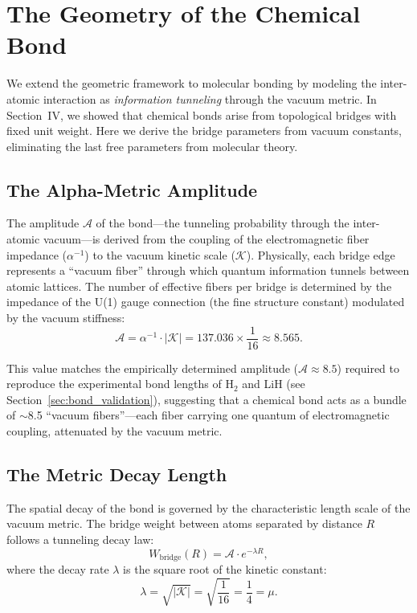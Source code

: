 \documentclass[aps,prd,twocolumn,superscriptaddress,groupedaddress,showpacs]{revtex4-2}
\newcommand{\alphainv}{\ensuremath{\alpha^{-1}}}
\begin{document}
\section{The Geometry of the Chemical Bond}
\label{sec:chemical_bond}

We extend the geometric framework to molecular bonding by modeling the inter-atomic interaction as \emph{information tunneling} through the vacuum metric. In Section~IV, we showed that chemical bonds arise from topological bridges with fixed unit weight. Here we derive the bridge parameters from vacuum constants, eliminating the last free parameters from molecular theory.

\subsection{The Alpha-Metric Amplitude}

The amplitude $\mathcal{A}$ of the bond---the tunneling probability through the inter-atomic vacuum---is derived from the coupling of the electromagnetic fiber impedance ($\alphainv$) to the vacuum kinetic scale ($\mathcal{K}$). Physically, each bridge edge represents a ``vacuum fiber'' through which quantum information tunnels between atomic lattices. The number of effective fibers per bridge is determined by the impedance of the U(1) gauge connection (the fine structure constant) modulated by the vacuum stiffness:
\begin{equation}
\mathcal{A} = \alphainv \cdot |\mathcal{K}| = 137.036 \times \frac{1}{16} \approx 8.565.
\label{eq:bridge_amplitude}
\end{equation}

This value matches the empirically determined amplitude ($\mathcal{A} \approx 8.5$) required to reproduce the experimental bond lengths of H$_2$ and LiH (see Section~\ref{sec:bond_validation}), suggesting that a chemical bond acts as a bundle of $\sim$8.5 ``vacuum fibers''---each fiber carrying one quantum of electromagnetic coupling, attenuated by the vacuum metric.

\subsection{The Metric Decay Length}

The spatial decay of the bond is governed by the characteristic length scale of the vacuum metric. The bridge weight between atoms separated by distance $R$ follows a tunneling decay law:
\begin{equation}
W_{\text{bridge}}(R) = \mathcal{A} \cdot e^{-\lambda R},
\label{eq:bridge_decay}
\end{equation}
where the decay rate $\lambda$ is the square root of the kinetic constant:
\begin{equation}
\lambda = \sqrt{|\mathcal{K}|} = \sqrt{\frac{1}{16}} = \frac{1}{4} = \mu.
\label{eq:decay_rate}
\end{equation}
\end{document}
